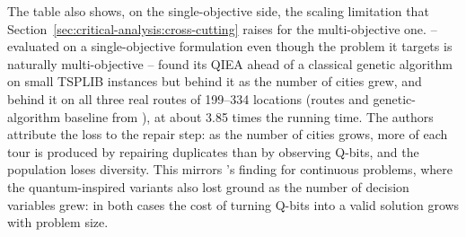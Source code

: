The table also shows, on the single-objective side, the scaling
limitation that Section~\ref{sec:critical-analysis:cross-cutting}
raises for the multi-objective one. \citet{gilea2026waste} --
evaluated on a single-objective formulation even though the problem it
targets is naturally multi-objective -- found its QIEA ahead of a classical
genetic algorithm on small TSPLIB instances but behind it as the number
of cities grew, and behind it on all three real routes of 199--334
locations (routes and genetic-algorithm baseline from
\citet{banciu2025icstcc}), at about 3.85 times the running time. The authors attribute
the loss to the repair step: as the number of cities grows, more of
each tour is produced by repairing duplicates than by observing
Q-bits, and the population loses diversity. This mirrors
\citet{olvera2023continuous}'s finding for continuous problems, where
the quantum-inspired variants also lost ground as the number of decision
variables grew: in both cases the cost of turning Q-bits into a valid
solution grows with problem size.


